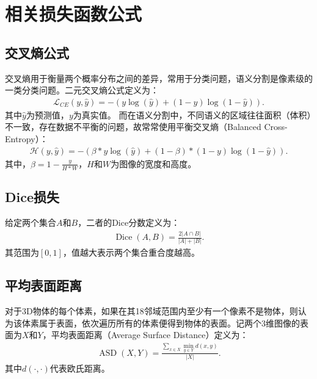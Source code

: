 \chapter{相关损失函数公式}

\section{交叉熵公式}
交叉熵用于衡量两个概率分布之间的差异，常用于分类问题，语义分割是像素级的一类分类问题。二元交叉熵公式定义为：
\begin{align}
    \mathcal{L}_{C E}(y, \hat{y})=-(y \log (\hat{y})+(1-y) \log (1-\hat{y})).
\end{align}
其中$\hat{y}$为预测值，$y$为真实值。
而在语义分割中，不同语义的区域往往面积（体积）不一致，存在数据不平衡的问题，故常常使用平衡交叉熵（Balanced Cross-Entropy）：
\begin{align}
    \mathcal{H}(y, \hat{y})=-(\beta * y \log (\hat{y})+(1-\beta) *(1-y) \log (1-\hat{y})).
\end{align}
其中，$\beta=1-\frac{y}{H*W}$，$H$和$W$为图像的宽度和高度。
\section{Dice损失}
给定两个集合$A$和$B$，二者的Dice分数定义为：
\begin{align}
    \operatorname{Dice}(A,B)=\frac{2|A\cap B|}{|A| + |B|}.
\end{align}
其范围为$\left[0, 1\right]$，值越大表示两个集合重合度越高。

\section{平均表面距离}
对于3D物体的每个体素，如果在其18邻域范围内至少有一个像素不是物体，则认为该体素属于表面，依次遍历所有的体素便得到物体的表面。记两个3维图像的表面为$X$和$Y$，平均表面距离（Average Surface Distance）定义为：
\begin{align}
    \operatorname{ASD}(X,Y) = \frac{\sum_{x\in X} \min_{y\in Y}d(x,y)}{|X|}.
\end{align}
其中$d(\cdot,\cdot)$代表欧氏距离。


\endinput
